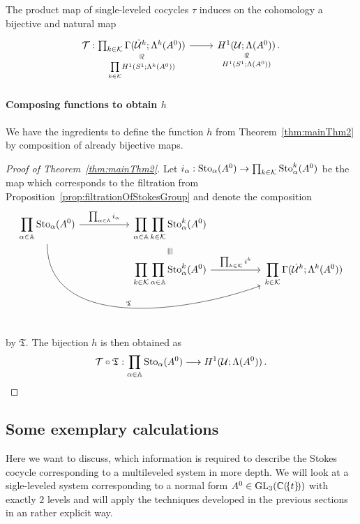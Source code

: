 \begin{cor}
  The product map of single-leveled cocycles $\tau$ induces on the cohomology
  a bijective and natural map
  \[ \begin{tikzcd}
    \cT:
    \underset{\underset{k\in\cK}\prod H^1(S^1;\Lambda^k(A^0))}{%
      \underset{\text{\rotatebox[origin=c]{-90}{$\cong$}}}{%
        \prod_{k\in\cK}\Gamma(\dot\cU^k;\Lambda^k(A^0))}}
    \rar&
    \underset{H^1(S^1;\Lambda(A^0))}{%
      \underset{\text{\rotatebox[origin=c]{-90}{$\cong$}}}{%
        H^1(\cU;\Lambda(A^0))}}\,.
  \end{tikzcd} \]
\end{cor}

\paragraph{Composing functions to obtain $h$}
We have the ingredients to define the function $h$ from
Theorem~\ref{thm:mainThm2} by composition of already bijective maps.
\begin{proof}[Proof of Theorem~\ref{thm:mainThm2}]
  Let $i_\alpha:\operatorname{Sto}_\alpha(A^0)\to\prod_{k\in\mathcal{K}}\operatorname{Sto}_\alpha^k(A^0)$ be the
  map which corresponds to the filtration from
  Proposition~\ref{prop:filtrationOfStokesGroup} and
  denote the composition
  \[ \begin{tikzcd}[column sep=1.8cm,row sep=0]
      \displaystyle \prod_{\alpha\in\A}\Sto_\alpha(A^0)
      \rar{\prod_{\alpha\in\A}i_\alpha}
      \arrow[ddrr, out=270,in=200,"\mathfrak{T}"]
      &
      \displaystyle \prod_{\alpha\in\A}\prod_{k\in\cK}\Sto_\alpha^k(A^0)
    \\&\text{\rotatebox[origin=c]{-90}{$\equiv$}}
    \\&\displaystyle \prod_{k\in\cK}\prod_{\alpha\in\A}\Sto_\alpha^k(A^0)
      \rar{\prod_{k\in\cK}i^k}&
      \displaystyle \prod_{k\in\cK}\Gamma(\dot\cU^k;\Lambda^k(A^0))
  \end{tikzcd} \]
  by $\mathfrak{T}$. The bijection $h$ is then obtained as
  \[
    \mathcal{T}\circ\mathfrak{T}: \prod_{\alpha\in\mathbb{A}}\operatorname{Sto}_\alpha(A^0)
    \longrightarrow H^1(\mathcal{U};\Lambda(A^0)) \,.
  \]
\end{proof}

\subsection{Some exemplary calculations}\label{sec:WhichInformationIsNeeded}
Here we want to discuss, which information is required to describe the Stokes
cocycle corresponding to a multileveled system in more depth.
We will look at a sigle-leveled system corresponding to a normal form
$A^0\in \operatorname{GL}_3(\mathbb{C}(\!\{t\}\!))$ with exactly $2$ levels and will apply the
techniques developed in the previous sections in an rather explicit way.

